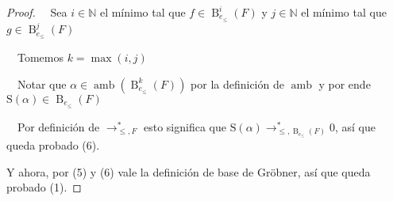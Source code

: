 \documentclass[fleqn]{amsbook} %
\theoremstyle{customstyle}
\DeclareMathOperator{\amb}{amb}
\renewcommand{\S}{\text{S}}
\DeclareMathOperator{\B}{B}
\begin{document}
\begin{proof}
  Sea $i ∈ ℕ$ el mínimo tal que $f ∈ \B_{e_≤}^i(F)$ y $j ∈ ℕ$ el mínimo tal que $g ∈ \B_{e_≤}^j(F)$

  Tomemos $k = \max(i, j)$

  Notar que $α ∈ \amb(\B_{e_≤}^k(F))$ por la definición de $\amb$ y por ende $\S(α) ∈ \B_{e_≤}(F)$

  Por definición de $→^*_{≤, F}$ esto significa que $\S(α) →^*_{≤, \B_{e_≤}(F)} 0$, así que queda probado (6).

Y ahora, por (5) y (6) vale la definición de base de Gröbner, así que queda probado (1).


\end{proof}


\end{document}
